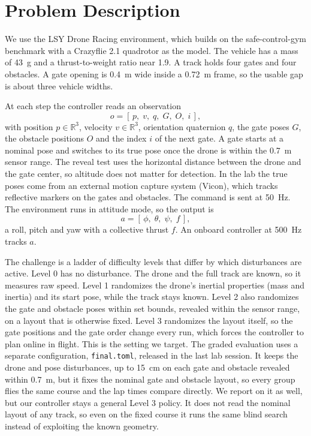 \documentclass[conference]{IEEEtran}
\begin{document}
\section{Problem Description}
\label{sec:problem}
We use the LSY Drone Racing environment, which builds on the safe-control-gym benchmark \cite{scg} with a Crazyflie 2.1 quadrotor \cite{crazyflie} as the model. The vehicle has a mass of 43~g and a thrust-to-weight ratio near 1.9. A track holds four gates and four obstacles. A gate opening is 0.4~m wide inside a 0.72~m frame, so the usable gap is about three vehicle widths.

At each step the controller reads an observation
\begin{equation}
o = [\, p,\; v,\; q,\; G,\; O,\; i \,],
\label{eq:obs}
\end{equation}
with position $p \in \mathbb{R}^3$, velocity $v \in \mathbb{R}^3$, orientation quaternion $q$, the gate poses $G$, the obstacle positions $O$ and the index $i$ of the next gate. A gate starts at a nominal pose and switches to its true pose once the drone is within the 0.7~m sensor range. The reveal test uses the horizontal distance between the drone and the gate center, so altitude does not matter for detection. In the lab the true poses come from an external motion capture system (Vicon), which tracks reflective markers on the gates and obstacles. The command is sent at 50~Hz. The environment runs in attitude mode, so the output is
\begin{equation}
a = [\, \phi,\; \theta,\; \psi,\; f \,],
\label{eq:act}
\end{equation}
a roll, pitch and yaw with a collective thrust $f$. An onboard controller at 500~Hz tracks $a$.

The challenge is a ladder of difficulty levels that differ by which disturbances are active. Level 0 has no disturbance. The drone and the full track are known, so it measures raw speed. Level 1 randomizes the drone's inertial properties (mass and inertia) and its start pose, while the track stays known. Level 2 also randomizes the gate and obstacle poses within set bounds, revealed within the sensor range, on a layout that is otherwise fixed. Level 3 randomizes the layout itself, so the gate positions and the gate order change every run, which forces the controller to plan online in flight. This is the setting we target. The graded evaluation uses a separate configuration, \texttt{final.toml}, released in the last lab session. It keeps the drone and pose disturbances, up to 15~cm on each gate and obstacle revealed within 0.7~m, but it fixes the nominal gate and obstacle layout, so every group flies the same course and the lap times compare directly. We report on it as well, but our controller stays a general Level 3 policy. It does not read the nominal layout of any track, so even on the fixed course it runs the same blind search instead of exploiting the known geometry.
\end{document}
